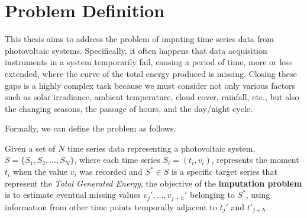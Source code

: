 \section{Problem Definition}
This thesis aims to address the problem of imputing time series data from
photovoltaic systems. Specifically, it often happens that data acquisition
instruments in a system temporarily fail, causing a period of time, more or
less extended, where the curve of the total energy produced is missing.
Closing these gaps is a highly complex task because we must consider not only various factors such as solar irradiance, ambient temperature, cloud cover, rainfall, etc., but also the changing seasons, the passage of hours, and the day/night cycle.

Formally, we can define the problem as follows.

\begin{definition}
	Given a set of $N$ time series data representing a photovoltaic system, $S = \{S_1, S_2, \ldots, S_N\}$, where each time series $S_i = (t_i, v_i)$,
	represents the moment $t_i$ when the value $v_i$ was recorded and $S^* \in S$ is a specific target series that represent the \textit{Total Generated Energy},
	the objective of the \textbf{imputation problem} is to estimate eventual missing values $v_j', \ldots, v_{j+h}'$ belonging to $S^*$, using information from other time points temporally adjacent to $t_j'$ and  $t'_{j+h}$.
\end{definition}

